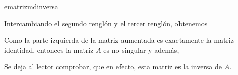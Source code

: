 \begin{examplebox}{}{ematrizmdinversa}
    \begin{matrizn}
    \end{matrizn}
    Intercambiando el segundo renglón y el tercer renglón, obtenemos
    \begin{matrizn}
    \end{matrizn}
    Como la parte izquierda de la matriz aumentada es exactamente la matriz identidad, entonces la matriz $A$ es no singular y además,
    \begin{matrizn}
    \end{matrizn}
    Se deja al lector comprobar, que en efecto, esta matriz es la inversa de $A$.
\end{examplebox}

